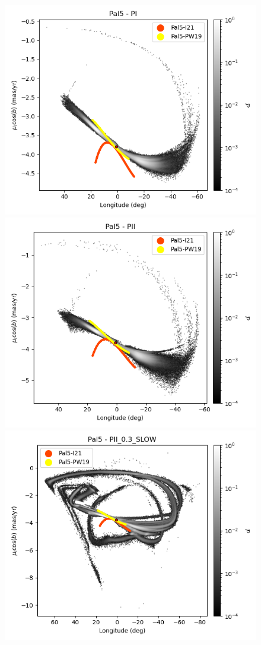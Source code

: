 \begin{figure}[h!]
\begin{center}
                    \includegraphics[clip=true, trim = 0mm 0mm 0mm 0mm, width=0.65\columnwidth]{images/PI_individual_Pal5_galstream-Pal5-l-pm_l_cosb.png}
                    \includegraphics[clip=true, trim = 0mm 0mm 0mm 0mm, width=0.65\columnwidth]{images/PII_individual_Pal5_galstream-Pal5-l-pm_l_cosb.png}
                    \includegraphics[clip=true, trim = 0mm 0mm 0mm 0mm, width=0.65\columnwidth]{images/PII_0.3_SLOW_individual_Pal5_galstream-Pal5-l-pm_l_cosb.png}


\end{center}
\end{figure}

